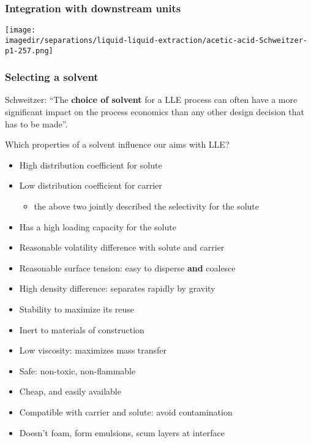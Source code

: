\begin{frame}\frametitle{Integration with downstream units}
	\begin{center}
		\texttt{[image: \\imagedir/separations/liquid-liquid-extraction/acetic-acid-Schweitzer-p1-257.png]}
	\end{center}
	\vspace{-10pt}
\end{frame}

\begin{frame}\frametitle{Selecting a solvent}
	Schweitzer: ``The \textbf{choice of solvent} for a LLE process can often have a more significant impact on the process economics than any other design decision that has to be made''.

	\vspace{6pt}
	Which properties of a solvent influence our aims with LLE?
	\begin{itemize}
		\item	High distribution coefficient for solute
		\item	Low distribution coefficient for carrier
			\begin{itemize}
				\item	the above two jointly described the {\color{purple} selectivity} for the solute
			\end{itemize}
		\item	{\color{myOrange} Has a high loading capacity for the solute}  %
		\item	Reasonable volatility difference with solute and carrier
		\item	Reasonable surface tension: easy to disperse \textbf{and} coalesce
		\item	High density difference: separates rapidly by gravity
		\item	Stability to maximize its reuse
		\item	Inert to materials of construction
		\item	Low viscosity: maximizes mass transfer
		\item	Safe: non-toxic, non-flammable
		\item	Cheap, and easily available
		\item	Compatible with carrier and solute: avoid contamination
		\item	Doesn't foam, form emulsions, scum layers at interface
	\end{itemize}
\end{frame}

